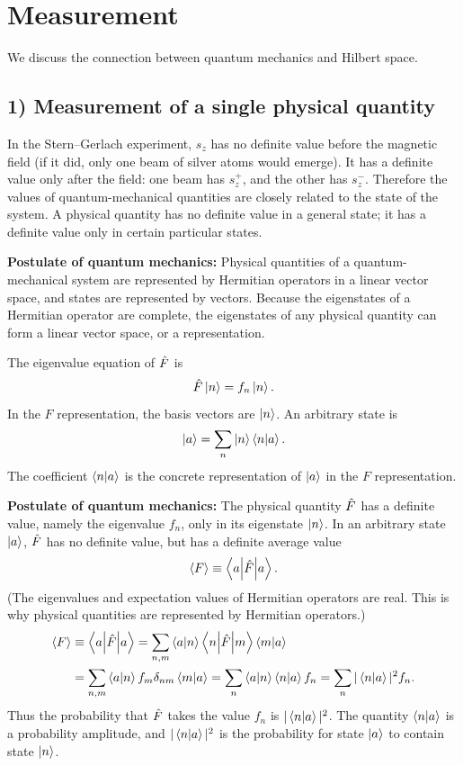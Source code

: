 \section{Measurement}
We discuss the connection between quantum mechanics and Hilbert space.
\subsection*{1) Measurement of a single physical quantity}
In the Stern--Gerlach experiment, $s_z$ has no definite value before the magnetic field (if it did, only one beam of silver atoms would emerge). It has a definite value only after the field: one beam has $s_z^+$, and the other has $s_z^-$. Therefore the values of quantum-mechanical quantities are closely related to the state of the system. A physical quantity has no definite value in a general state; it has a definite value only in certain particular states.

\textbf{Postulate of quantum mechanics:} Physical quantities of a quantum-mechanical system are represented by Hermitian operators in a linear vector space, and states are represented by vectors. Because the eigenstates of a Hermitian operator are complete, the eigenstates of any physical quantity can form a linear vector space, or a representation.

The eigenvalue equation of $\hat{F}$ is
\begin{equation}
\hat{F}\left|n\right\rangle=f_n\left|n\right\rangle.
\end{equation}
In the $F$ representation, the basis vectors are $\left|n\right\rangle$. An arbitrary state is
\begin{equation}
\left|a\right\rangle=\sum_n\left|n\right\rangle\left\langle n\middle|a\right\rangle.
\end{equation}
The coefficient $\left\langle n\middle|a\right\rangle$ is the concrete representation of $\left|a\right\rangle$ in the $F$ representation.

\textbf{Postulate of quantum mechanics:} The physical quantity $\hat{F}$ has a definite value, namely the eigenvalue $f_n$, only in its eigenstate $\left|n\right\rangle$. In an arbitrary state $\left|a\right\rangle$, $\hat{F}$ has no definite value, but has a definite average value
\begin{equation}
\langle F\rangle\equiv\left\langle a\middle|\hat{F}\middle|a\right\rangle.
\end{equation}
(The eigenvalues and expectation values of Hermitian operators are real. This is why physical quantities are represented by Hermitian operators.)
\begin{equation}\begin{aligned}
\langle F\rangle
&\equiv\left\langle a\middle|\hat{F}\middle|a\right\rangle
=\sum_{n,m}\left\langle a\middle|n\right\rangle\left\langle n\middle|\hat{F}\middle|m\right\rangle\left\langle m\middle|a\right\rangle\\
&=\sum_{n,m}\left\langle a\middle|n\right\rangle f_m\delta_{nm}\left\langle m\middle|a\right\rangle
=\sum_n\left\langle a\middle|n\right\rangle\left\langle n\middle|a\right\rangle f_n
=\sum_n|\left\langle n\middle|a\right\rangle|^2f_n.
\end{aligned}\end{equation}
Thus the probability that $\hat{F}$ takes the value $f_n$ is $|\left\langle n\middle|a\right\rangle|^2$. The quantity $\left\langle n\middle|a\right\rangle$ is a probability amplitude, and $|\left\langle n\middle|a\right\rangle|^2$ is the probability for state $\left|a\right\rangle$ to contain state $\left|n\right\rangle$.

